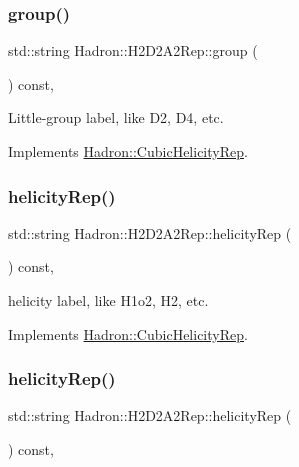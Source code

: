 \subsubsection{\texorpdfstring{group()}{group()}\hspace{0.1cm}{\footnotesize\ttfamily [5/5]}}
{\footnotesize\ttfamily std\+::string Hadron\+::\+H2\+D2\+A2\+Rep\+::group (\begin{DoxyParamCaption}{ }\end{DoxyParamCaption}) const\hspace{0.3cm}{\ttfamily [inline]}, {\ttfamily [virtual]}}

Little-\/group label, like D2, D4, etc. 

Implements \mbox{\hyperlink{structHadron_1_1CubicHelicityRep_a101a7d76cd8ccdad0f272db44b766113}{Hadron\+::\+Cubic\+Helicity\+Rep}}.

\mbox{\label{structHadron_1_1H2D2A2Rep_adfa1f1bca5e0e98eb2eca39372ca7245}} 
\subsubsection{\texorpdfstring{helicityRep()}{helicityRep()}\hspace{0.1cm}{\footnotesize\ttfamily [1/3]}}
{\footnotesize\ttfamily std\+::string Hadron\+::\+H2\+D2\+A2\+Rep\+::helicity\+Rep (\begin{DoxyParamCaption}{ }\end{DoxyParamCaption}) const\hspace{0.3cm}{\ttfamily [inline]}, {\ttfamily [virtual]}}

helicity label, like H1o2, H2, etc. 

Implements \mbox{\hyperlink{structHadron_1_1CubicHelicityRep_af1096946b7470edf0a55451cc662f231}{Hadron\+::\+Cubic\+Helicity\+Rep}}.

\mbox{\label{structHadron_1_1H2D2A2Rep_adfa1f1bca5e0e98eb2eca39372ca7245}} 
\subsubsection{\texorpdfstring{helicityRep()}{helicityRep()}\hspace{0.1cm}{\footnotesize\ttfamily [2/3]}}
{\footnotesize\ttfamily std\+::string Hadron\+::\+H2\+D2\+A2\+Rep\+::helicity\+Rep (\begin{DoxyParamCaption}{ }\end{DoxyParamCaption}) const\hspace{0.3cm}{\ttfamily [inline]}, {\ttfamily [virtual]}}

